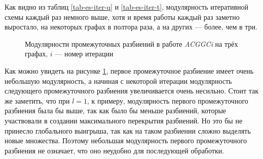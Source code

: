 Как видно из таблиц \ref{tab-es-iter-q} и \ref{tab-es-iter-t}, модулярность итеративной схемы каждый раз немного выше, хотя и время работы каждый раз заметно выростало, на некоторых графах в полтора раза, а на других --- более, чем в три.

\begin{figure}[H]
	\caption{Модулярности промежуточных разбиений в работе \emph{ACGGCi} на трёх графах, $i$ --- номер итерации}
	\label{fig:es-iter}
\end{figure}

Как можно увидеть на рисунке \ref{fig:es-iter}, первое промежуточное разбиение имеет очень небольшую модулярность, а начиная с некоторой итерации модулярность следующего промежуточного разбиения увеличивается очень несильно. Стоит так же заметить, что при $l = 1$, к примеру, модулярность первого промежуточного разбиения была бы выше, так как было бы меньше разбиений, которые участвовали в создании максимального перекрытия разбиений. Но это бы не принесло глобального выигрыша, так как на таком разбиении сложно выделять новые множества. Поэтому небольшая модулярность первого промежуточного разбиения не означает, что оно неудобно для последующей обработки.

